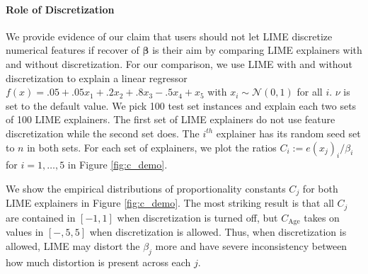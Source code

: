 \documentclass[mnsc,blindrev]{informs3}
\begin{document}
                \paragraph{Role of Discretization}
                    We provide evidence of our claim that users should not let LIME discretize numerical features if recover of $\boldsymbol{\beta}$ is their aim by comparing LIME explainers with and without discretization. For our comparison, we use LIME with and without discretization to explain a linear regressor $f(x) = .05 + .05x_1+ .2x_2+ .8x_3 -.5x_4 +x_5$ with $x_i \sim \mathcal{N}(0,1)$ for all $i$. $\nu$ is set to the default value. We pick 100 test set instances and explain each two sets of 100 LIME explainers. The first set of LIME explainers do not use feature discretization while the second set does. The $i^{th}$ explainer has its random seed set to $n$ in both sets. For each set of explainers, we plot the ratios $C_i:= e(x_j)_i/\beta_i$ for $i=1,\ldots,5$ in Figure \ref{fig:c_demo}.


                We show the empirical distributions of proportionality constants $C_j$ for both LIME explainers in Figure \ref{fig:c_demo}. The most striking result is that all $C_j$ are contained in $[-1,1]$ when discretization is turned off, but $C_{\text{Age}}$ takes on values in $[-,5,5]$ when discretization is allowed. Thus, when discretization is allowed, LIME may distort the $\beta_j$ more and have severe inconsistency between how much distortion is present across each $j$.
                
\end{document}
